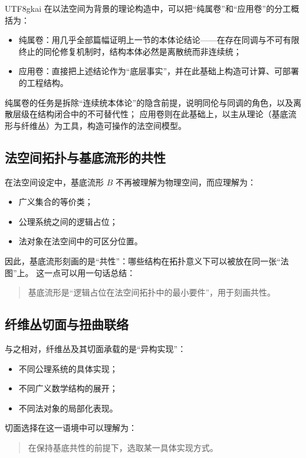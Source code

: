 \documentclass[12pt]{article}
\begin{document}
\begin{CJK*}{UTF8}{gkai}
在以法空间为背景的理论构造中，可以把“纯属卷”和“应用卷”的分工概括为：
\begin{itemize}
  \item 纯属卷：用几乎全部篇幅证明上一节的本体论结论——在存在同调与不可有限终止的同伦修复机制时，结构本体必然是离散统而非连续统；
  \item 应用卷：直接把上述结论作为“底层事实”，并在此基础上构造可计算、可部署的工程结构。
\end{itemize}

纯属卷的任务是拆除“连续统本体论”的隐含前提，说明同伦与同调的角色，以及离散层级在结构闭合中的不可替代性；
应用卷则在此基础上，以主从理论（基底流形与纤维丛）为工具，构造可操作的法空间模型。

\subsection{法空间拓扑与基底流形的共性}

在法空间设定中，基底流形 $B$ 不再被理解为物理空间，而应理解为：
\begin{itemize}
  \item 广义集合的等价类；
  \item 公理系统之间的逻辑占位；
  \item 法对象在法空间中的可区分位置。
\end{itemize}

因此，基底流形刻画的是“共性”：哪些结构在拓扑意义下可以被放在同一张“法图”上。
这一点可以用一句话总结：
\begin{quote}
基底流形是“逻辑占位在法空间拓扑中的最小要件”，用于刻画共性。
\end{quote}

\subsection{纤维丛切面与扭曲联络}

与之相对，纤维丛及其切面承载的是“异构实现”：
\begin{itemize}
  \item 不同公理系统的具体实现；
  \item 不同广义数学结构的展开；
  \item 不同法对象的局部化表现。
\end{itemize}

切面选择在这一语境中可以理解为：
\begin{quote}
在保持基底共性的前提下，选取某一具体实现方式。
\end{quote}


\end{CJK*}
\end{document}

